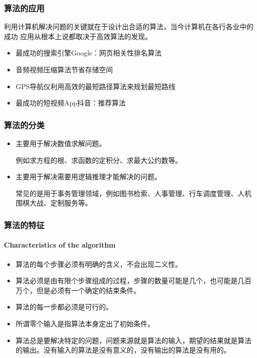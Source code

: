 \begin{frame}
    \frametitle{算法的应用}
    利用计算机解决问题的关键就在于设计出合适的算法，当今计算机在各行各业中的成功 应用从根本上说都取决于高效算法的发现。
    \begin{itemize}
      \item  最成功的搜索引擎Google：网页相关性排名算法
      \item 音频视频压缩算法节省存储空间
      \item GPS导航仪利用高效的最短路径算法来规划最短路线
      \item 最成功的短视频App抖音：推荐算法
    \end{itemize}
\end{frame}


\begin{frame}
    \frametitle{算法的分类}
    \begin{itemize}
      \item {}
      
      主要用于解决数值求解问题。

      例如求方程的根、求函数的定积分、求最大公约数等。
      \item {}
      
      主要用于解决需要用逻辑推理才能解决的问题。
      
      常见的是用于事务管理领域，例如图书检索、人事管理、行车调度管理、人机围棋大战、定制服务等。
    \end{itemize}
\end{frame}

\begin{frame}
    \frametitle{算法的特征}
    \framesubtitle{Characteristics of the algorithm}
    \begin{itemize}
      \item {}
        
      算法的每个步骤必须有明确的含义，不会出现二义性。
      
      \item {}
      
      算法必须是由有限个步骤组成的过程，步骤的数量可能是几个，也可能是几百万个，但是必须有一个确定的结束条件。
      \item {}
      
      算法的每一步都必须是可行的。
      
      \item {}
      
      所谓零个输入是指算法本身定出了初始条件。
      
      \item {}
      
      算法总是要解决特定的问题，问题来源就是算法的输入，期望的结果就是算法的输出。没有输入的算法是没有意义的，没有输出的算法是没有用的。
      
    \end{itemize}

\end{frame}